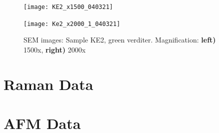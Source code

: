 \begin{figure}[H]
\centering
\begin{minipage}{.45\textwidth}
  \centering
  \texttt{[image: KE2\_x1500\_040321]}
\end{minipage}
\begin{minipage}{.45\textwidth}
  \centering
  \texttt{[image: Ke2\_x2000\_1\_040321]}
\end{minipage}
\caption[SEM images: Sample KE2, green verditer]{SEM images: Sample KE2, green verditer. Magnification: \textbf{left)} 1500x, \textbf{right)} 2000x}
\label{fig:KE2_sem_2}
\end{figure}



\section[Raman Data]{Raman Data}
\label{section3.2}



\section[AFM Data]{AFM Data}
\label{section3.3}
